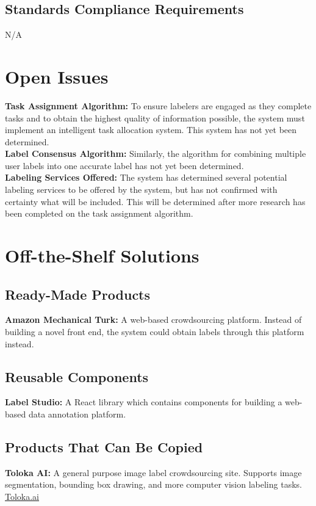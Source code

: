 \documentclass[12pt]{article}
\begin{document}
\subsection{Standards Compliance Requirements}
N/A

\section{Open Issues}
\textbf{Task Assignment Algorithm: }To ensure labelers are engaged as they complete tasks and to obtain the highest quality of information possible, the system must implement an intelligent task allocation system. This system has not yet been determined.
\\\textbf{Label Consensus Algorithm: }Similarly, the algorithm for combining multiple user labels into one accurate label has not yet been determined. 
\\\textbf{Labeling Services Offered: }The system has determined several potential labeling services to be offered by the system, but has not confirmed with certainty what will be included. This will be determined after more research has been completed on the task assignment algorithm.

\section{Off-the-Shelf Solutions}
\subsection{Ready-Made Products}
\textbf{Amazon Mechanical Turk: } A web-based crowdsourcing platform. Instead of building a novel front end, the system could obtain labels through this platform instead.
\subsection{Reusable Components}
\textbf{Label Studio: } A React library which contains components for building a web-based data annotation platform.
\subsection{Products That Can Be Copied}
\textbf{Toloka AI: } A general purpose image label crowdsourcing site. Supports image segmentation, bounding box drawing, and more computer vision labeling tasks. \href{https://toloka.ai/}{Toloka.ai}
\end{document}
